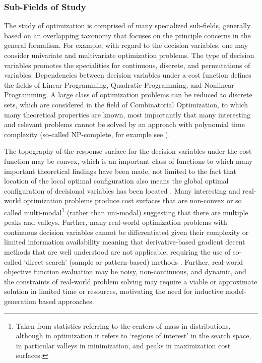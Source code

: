 \documentclass[a4paper, 11pt]{article}
\begin{document}
%
%
\subsubsection{Sub-Fields of Study}
The study of optimization is comprised of many specialized sub-fields, generally based on an overlapping taxonomy that focuses on the principle concerns in the general formalism. 
For example, with regard to the decision variables, one may consider univariate and multivariate optimization problems. The type of decision variables promotes the specialities for continuous, discrete, and permutations of variables. Dependencies between decision variables under a cost function defines the fields of Linear Programming, Quadratic Programming, and Nonlinear Programming. A large class of optimization problems can be reduced to discrete sets, which are considered in the field of Combinatorial Optimization, to which many theoretical properties are known, most importantly that many interesting and relevant problems cannot be solved by an approach with polynomial time complexity (so-called NP-complete, for example see \cite{Papadimitriou1998}).

The topography of the response surface for the decision variables under the cost function may be convex, which is an important class of functions to which many important theoretical findings have been made, not limited to the fact that location of the local optimal configuration also means the global optimal configuration of decisional variables has been located \cite{Boyd2004}. Many interesting and real-world optimization problems produce cost surfaces that are non-convex or so called multi-modal\footnote{Taken from statistics referring to the centers of mass in distributions, although in optimization it refers to `regions of interest' in the search space, in particular valleys in minimization, and peaks in maximization cost surfaces.} (rather than uni-modal) suggesting that there are multiple peaks and valleys. Further, many real-world optimization problems with continuous decision variables cannot be differentiated given their complexity or limited information availability meaning that derivative-based gradient decent methods that are well understood are not applicable, requiring the use of so-called `direct search' (sample or pattern-based) methods \cite{Lewis2000}. Further, real-world objective function evaluation may be noisy, non-continuous, and dynamic, and the constraints of real-world problem solving may require a viable or approximate solution in limited time or resources, motivating the need for inductive model-generation based approaches.
\end{document}
